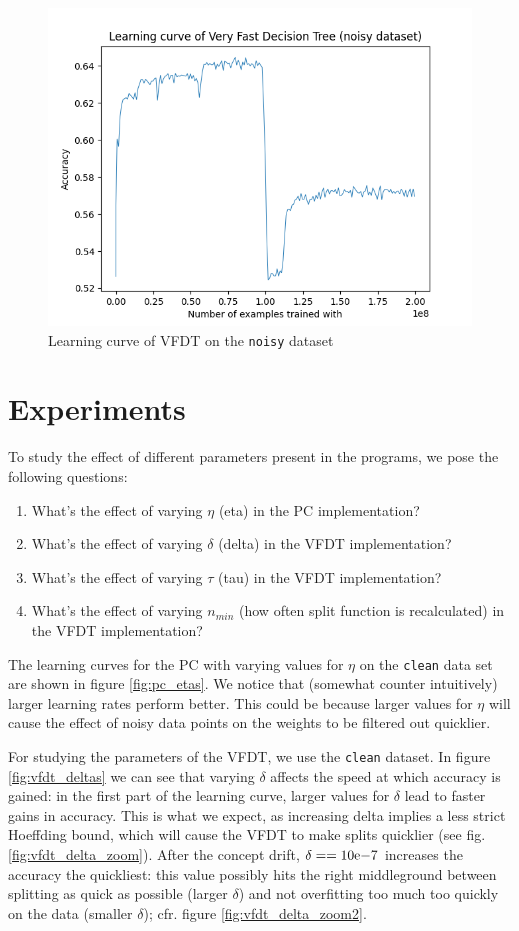 \documentclass[12pt]{article}
\begin{document}
\begin{figure}
	\centering
	\includegraphics[width=.8\linewidth]{../plots/vfdt_noise}
	\caption{Learning curve of VFDT on the \texttt{noisy} dataset}
	\label{fig:vfdt_noise}
\end{figure}
\section{Experiments}
To study the effect of different parameters present in the programs, we pose the following questions:
\begin{enumerate}
	\item What's the effect of varying $\eta$ (eta) in the PC implementation?
	\item What's the effect of varying $\delta$ (delta) in the VFDT implementation?
	\item What's the effect of varying $\tau$ (tau) in the VFDT implementation?
	\item What's the effect of varying $n_{min}$ (how often split function is recalculated) in the VFDT implementation?
\end{enumerate}

The learning curves for the PC with varying values for $\eta$ on the \texttt{clean} data set are shown in figure \ref{fig:pc_etas}. We notice that (somewhat counter intuitively) larger learning rates perform better. This could be because larger values for $\eta$ will cause the effect of noisy data points on the weights to be filtered out quicklier.

For studying the parameters of the VFDT, we use the \texttt{clean} dataset. In figure \ref{fig:vfdt_deltas} we can see that varying $\delta$ affects the speed at which accuracy is gained: in the first part of the learning curve, larger values for $\delta$ lead to faster gains in accuracy. This is what we expect, as increasing delta implies a less strict Hoeffding bound, which will cause the VFDT to make splits quicklier (see fig. \ref{fig:vfdt_delta_zoom}). After the concept drift, $\delta == 10\mathrm{e}{-7}$ increases the accuracy the quickliest: this value possibly hits the right middleground between splitting as quick as possible (larger $\delta$) and not overfitting too much too quickly on the data (smaller $\delta$); cfr. figure \ref{fig:vfdt_delta_zoom2}.
\end{document}
